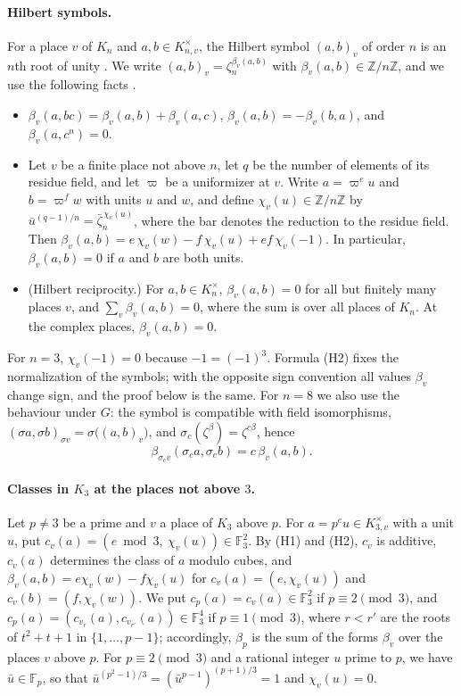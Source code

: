 \documentclass[11pt]{article}
\newcommand{\Z}{\mathbb{Z}}
\newcommand{\F}{\mathbb{F}}
\begin{document}
\paragraph{Hilbert symbols.} For a place $v$ of $K_n$ and $a,b\in K_{n,v}^\times$, the Hilbert symbol $(a,b)_v$ of order $n$ is an $n$th root of unity \cite[Chapter~V, \S3]{N}. We write $(a,b)_v=\zeta_n^{\beta_v(a,b)}$ with $\beta_v(a,b)\in\Z/n\Z$, and we use the following facts \cite[Chapter~V, \S3 and Chapter~VI, \S8]{N}.
\begin{itemize}
\item[(H1)] $\beta_v(a,bc)=\beta_v(a,b)+\beta_v(a,c)$, $\beta_v(a,b)=-\beta_v(b,a)$, and $\beta_v(a,c^n)=0$.
\item[(H2)] Let $v$ be a finite place not above $n$, let $q$ be the number of elements of its residue field, and let $\varpi$ be a uniformizer at $v$. Write $a=\varpi^eu$ and $b=\varpi^fw$ with units $u$ and $w$, and define $\chi_v(u)\in\Z/n\Z$ by $\bar u^{(q-1)/n}=\bar\zeta_n^{\,\chi_v(u)}$, where the bar denotes the reduction to the residue field. Then $\beta_v(a,b)=e\,\chi_v(w)-f\,\chi_v(u)+ef\,\chi_v(-1)$. In particular, $\beta_v(a,b)=0$ if $a$ and $b$ are both units.
\item[(H3)] (Hilbert reciprocity.) For $a,b\in K_n^\times$, $\beta_v(a,b)=0$ for all but finitely many places $v$, and $\sum_v\beta_v(a,b)=0$, where the sum is over all places of $K_n$. At the complex places, $\beta_v(a,b)=0$.
\end{itemize}
For $n=3$, $\chi_v(-1)=0$ because $-1=(-1)^3$. Formula (H2) fixes the normalization of the symbols; with the opposite sign convention all values $\beta_v$ change sign, and the proof below is the same. For $n=8$ we also use the behaviour under $G$: the symbol is compatible with field isomorphisms, $(\sigma a,\sigma b)_{\sigma v}=\sigma\bigl((a,b)_v\bigr)$, and $\sigma_c(\zeta^\beta)=\zeta^{c\beta}$, hence
\begin{equation}\label{eq:galois}
\beta_{\sigma_c v}(\sigma_c a,\sigma_c b)=c\,\beta_v(a,b).
\end{equation}

\paragraph{Classes in $K_3$ at the places not above $3$.} Let $p\neq3$ be a prime and $v$ a place of $K_3$ above $p$. For $a=p^eu\in K_{3,v}^\times$ with a unit $u$, put $c_v(a)=(e\bmod3,\ \chi_v(u))\in\F_3^2$. By (H1) and (H2), $c_v$ is additive, $c_v(a)$ determines the class of $a$ modulo cubes, and $\beta_v(a,b)=e\chi_v(w)-f\chi_v(u)$ for $c_v(a)=(e,\chi_v(u))$ and $c_v(b)=(f,\chi_v(w))$. We put $c_p(a)=c_v(a)\in\F_3^2$ if $p\equiv2\pmod3$, and $c_p(a)=(c_{v_r}(a),c_{v_{r'}}(a))\in\F_3^4$ if $p\equiv1\pmod3$, where $r<r'$ are the roots of $t^2+t+1$ in $\{1,\dots,p-1\}$; accordingly, $\beta_p$ is the sum of the forms $\beta_v$ over the places $v$ above $p$. For $p\equiv2\pmod3$ and a rational integer $u$ prime to $p$, we have $\bar u\in\F_p$, so that $\bar u^{(p^2-1)/3}=(\bar u^{p-1})^{(p+1)/3}=1$ and $\chi_v(u)=0$.
\end{document}

